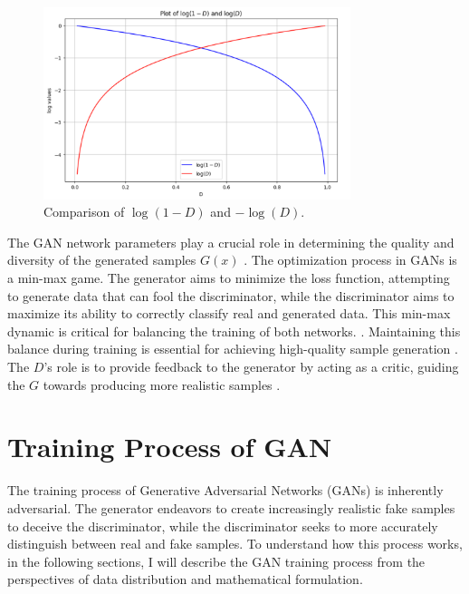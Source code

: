 \begin{figure}[H]
    \centering
    \includegraphics[width=0.8\textwidth]{./Images/log_gunction.jpg}
    \caption{Comparison of $\log(1 - D)$ and $-\log(D)$.}
    \label{fig:log_function}
\end{figure}


The GAN network parameters play a crucial role in determining the quality and diversity of 
the generated samples $G(x)$ \citep{10.1007/s10928-021-09787-4}. The optimization process in GANs is a min-max game. 
The generator aims to minimize the loss function, attempting to generate data that can fool the discriminator, while 
the discriminator aims to maximize its ability to correctly classify real and generated data. This min-max dynamic 
is critical for balancing the training of both networks. \citep{10.1109/taslp.2017.2761547}. Maintaining this balance 
during training is essential for achieving high-quality sample generation \citep{10.1007/s10928-021-09787-4}. 
The $D$'s role is to provide feedback to the generator by acting as a critic, 
guiding the $G$ towards producing more realistic samples \citep{10.48550/arxiv.1802.05637}.



\section{Training Process of GAN}

The training process of Generative Adversarial Networks (GANs) is inherently adversarial. 
The generator endeavors to create increasingly realistic fake samples to deceive the discriminator, 
while the discriminator seeks to more accurately distinguish between real and fake samples. 
To understand how this process works, in the following sections, 
I will describe the GAN training process from the perspectives of data distribution and mathematical formulation.

